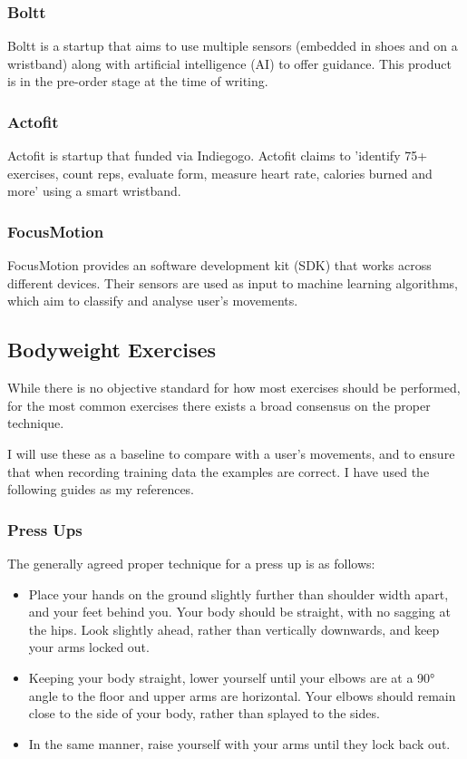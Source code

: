 \documentclass[a4paper]{article}
\begin{document}
\subsubsection{Boltt}

Boltt\cite{bgref12} is a startup that aims to use multiple sensors (embedded in shoes and on a wristband) along with artificial intelligence (AI) to offer guidance. This product is in the pre-order stage at the time of writing.

\subsubsection{Actofit}

Actofit\cite{bgref13} is startup that funded via Indiegogo\cite{bgref14}. Actofit claims to 'identify 75+ exercises, count reps, evaluate form, measure heart rate, calories burned and more' using a smart wristband.

\subsubsection{FocusMotion}

FocusMotion\cite{bgref15} provides an software development kit (SDK) that works across different devices. Their sensors are used as input to machine learning algorithms, which aim to classify and analyse user's movements.

\newpage
\subsection{Bodyweight Exercises}%
\label{subsec:bg_exercises}

While there is no objective standard for how most exercises should be performed, for the most common exercises there exists a broad consensus on the proper technique.

I will use these as a baseline to compare with a user's movements, and to ensure that when recording training data the examples are correct. I have used the following guides as my references.

\subsubsection{Press Ups}

The generally agreed proper technique for a press up is as follows:

\begin{itemize}
    \item Place your hands on the ground slightly further than shoulder width apart, and your feet behind you. Your body should be straight, with no sagging at the hips. Look slightly ahead, rather than vertically downwards, and keep your arms locked out.
    \item Keeping your body straight, lower yourself until your elbows are at a 90° angle to the floor and upper arms are horizontal. Your elbows should remain close to the side of your body, rather than splayed to the sides.
    \item In the same manner, raise yourself with your arms until they lock back out.
\end{itemize}
\end{document}
